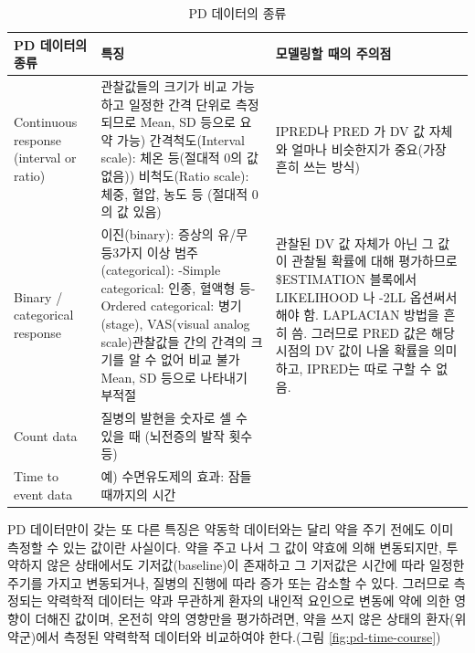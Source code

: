 \documentclass[
  11pt,
  krantz2,
  a4paper]{krantz}
\theoremstyle{definition}
\theoremstyle{definition}
\theoremstyle{definition}
\theoremstyle{remark}
\begin{document}
\begin{table}

\caption{\label{tab:pd-data-property}PD 데이터의 종류}
\centering
\begin{tabular}[t]{>{\raggedright\arraybackslash}p{3.0cm}>{\raggedright\arraybackslash}p{5.5cm}>{\raggedright\arraybackslash}p{4.5cm}}
\toprule
PD 데이터의 종류 & 특징 & 모델링할 때의 주의점\\
\midrule
Continuous response (interval or ratio) & 관찰값들의 크기가 비교 가능하고 일정한 간격 단위로 측정되므로 Mean, SD 등으로 요약 가능\newline 1) 간격척도(Interval scale): 체온 등(절대적 0의 값 없음)\newline 2) 비척도(Ratio scale): 체중, 혈압, 농도 등 (절대적 0의 값 있음) & IPRED나 PRED 가 DV 값 자체와 얼마나 비슷한지가 중요(가장 흔히 쓰는 방식)\\
Binary / categorical response & 이진(binary): 증상의 유/무 등\newline 3가지 이상 범주(categorical): \newline -Simple categorical: 인종, 혈액형 등\newline -Ordered categorical: 병기(stage), VAS(visual analog scale)\newline 관찰값들 간의 간격의 크기를 알 수 없어 비교 불가\newline Mean, SD 등으로 나타내기 부적절 & 관찰된 DV 값 자체가 아닌 그 값이 관찰될 확률에 대해 평가하므로 \$ESTIMATION 블록에서 LIKELIHOOD 나 -2LL 옵션써서 해야 함. LAPLACIAN 방법을 흔히 씀. 그러므로 PRED 값은 해당 시점의 DV 값이 나올 확률을 의미하고, IPRED는 따로 구할 수 없음.\\
Count data & 질병의 발현을 숫자로 셀 수 있을 때 (뇌전증의 발작 횟수 등) & \\
Time to event data & 예) 수면유도제의 효과: 잠들 때까지의 시간 & \\
\bottomrule
\end{tabular}
\end{table}

PD 데이터만이 갖는 또 다른 특징은 약동학 데이터와는 달리 약을 주기 전에도 이미 측정할 수 있는 값이란 사실이다. 약을 주고 나서 그 값이 약효에 의해 변동되지만, 투약하지 않은 상태에서도 기저값(baseline)이 존재하고 그 기저값은 시간에 따라 일정한 주기를 가지고 변동되거나, 질병의 진행에 따라 증가 또는 감소할 수 있다. 그러므로 측정되는 약력학적 데이터는 약과 무관하게 환자의 내인적 요인으로 변동에 약에 의한 영향이 더해진 값이며, 온전히 약의 영향만을 평가하려면, 약을 쓰지 않은 상태의 환자(위약군)에서 측정된 약력학적 데이터와 비교하여야 한다.(그림 \ref{fig:pd-time-course})
\end{document}
